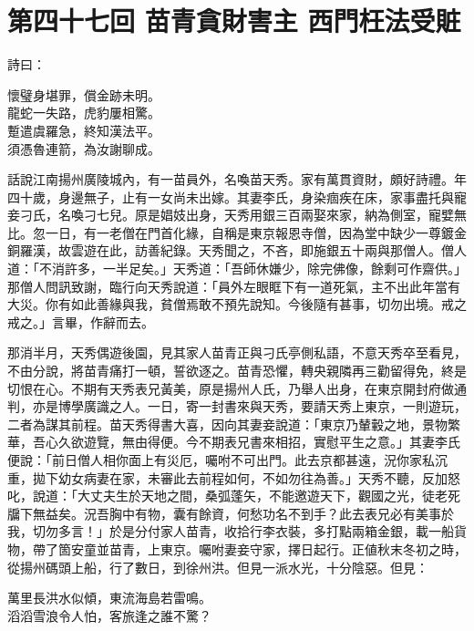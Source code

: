 
\chapter*{第四十七回 苗青貪財害主 西門枉法受賍}


詩曰：

\begin{myquote}
懷璧身堪罪，償金跡未明。\\龍蛇一失路，虎豹屢相驚。\\蹔遣虞羅急，終知漢法平。\\須憑魯連箭，為汝謝聊成。
\end{myquote}

話說江南揚州廣陵城內，有一苗員外，名喚苗天秀。家有萬貫資財，頗好詩禮。年四十歲，身邊無子，止有一女尚未出嫁。其妻李氏，身染痼疾在床，家事盡托與寵妾刁氏，名喚刁七兒。原是娼妓出身，天秀用銀三百兩娶來家，納為側室，寵嬖無比。{}忽一日，有一老僧在門首化緣，自稱是東京報恩寺僧，因為堂中缺少一尊鍍金銅羅漢，故雲遊在此，訪善紀錄。天秀聞之，不吝，即施銀五十兩與那僧人。僧人道：「不消許多，一半足矣。」天秀道：「吾師休嫌少，除完佛像，餘剩可作齋供。」那僧人問訊致謝，臨行向天秀說道：「員外左眼眶下有一道死氣，主不出此年當有大災。你有如此善緣與我，貧僧焉敢不預先說知。今後隨有甚事，切勿出境。戒之戒之。」言畢，作辭而去。

那消半月，天秀偶遊後園，見其家人苗青正與刁氏亭側私語，不意天秀卒至看見，不由分說，將苗青痛打一頓，誓欲逐之。苗青恐懼，轉央親隣再三勸留得免，終是切恨在心。不期有天秀表兄黃美，原是揚州人氏，乃舉人出身，在東京開封府做通判，亦是博學廣識之人。一日，寄一封書來與天秀，要請天秀上東京，一則遊玩，二者為謀其前程。苗天秀得書大喜，因向其妻妾說道：「東京乃輦轂之地，景物繁華，吾心久欲遊覽，無由得便。今不期表兄書來相招，實慰平生之意。」其妻李氏便說：「前日僧人相你面上有災厄，囑咐不可出門。此去京都甚遠，況你家私沉重，拋下幼女病妻在家，未審此去前程如何，不如勿往為善。」天秀不聽，反加怒叱，說道：「大丈夫生於天地之間，桑弧蓬矢，不能邀遊天下，觀國之光，徒老死牖下無益矣。況吾胸中有物，囊有餘資，何愁功名不到手？此去表兄必有美事於我，切勿多言！」於是分付家人苗青，收拾行李衣裝，多打點兩箱金銀，載一船貨物，帶了箇安童並苗青，上東京。囑咐妻妾守家，擇日起行。正値秋末冬初之時，從揚州碼頭上船，行了數日，到徐州洪。但見一派水光，十分陰惡。但見：

\begin{myquote}
萬里長洪水似傾，東流海島若雷鳴。\\滔滔雪浪令人怕，客旅逢之誰不驚？
\end{myquote}

